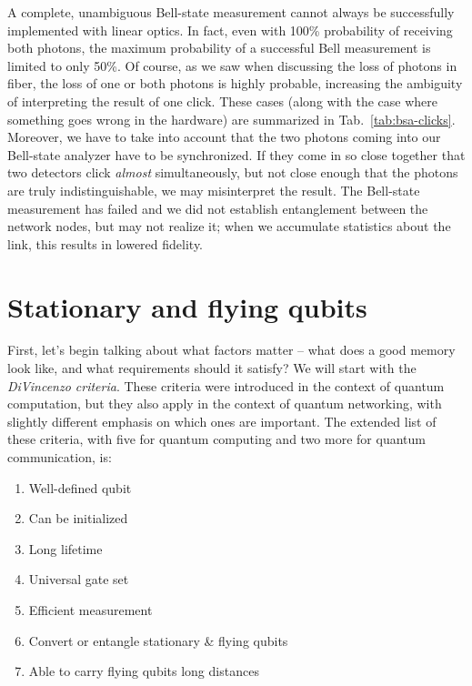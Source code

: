 A complete, unambiguous Bell-state measurement cannot always be successfully implemented with linear optics. In fact, even with 100\% probability of receiving both photons, the maximum probability of a successful Bell measurement is limited to only 50\%.  Of course, as we saw when discussing the loss of photons in fiber, the loss of one or both photons is highly probable, increasing the ambiguity of interpreting the result of one click.  These cases (along with the case where something goes wrong in the hardware) are summarized in Tab.~\ref{tab:bsa-clicks}. 
Moreover, we have to take into account that the two photons coming into our Bell-state analyzer have to be synchronized. If they come in so close together that two detectors click \emph{almost} simultaneously, but not close enough that the photons are truly indistinguishable, we may misinterpret the result. The Bell-state measurement has failed and we did not establish entanglement between the network nodes, but may not realize it; when we accumulate statistics about the link, this results in lowered fidelity.


\section{Stationary and flying qubits}

First, let's begin talking about what factors matter -- what does a good memory look like, and what requirements should it satisfy?  We will start with the \emph{DiVincenzo criteria}. These criteria were introduced in the context of quantum computation, but they also apply in the context of quantum networking, with slightly different emphasis on which ones are important.  The extended list of these criteria, with five for quantum computing and two more for quantum communication, is:

\begin{enumerate}
    \item Well-defined qubit
    \item Can be initialized
    \item Long lifetime
    \item Universal gate set
    \item Efficient measurement
    \item Convert or entangle stationary \& flying qubits
    \item Able to carry flying qubits long distances
\end{enumerate}

